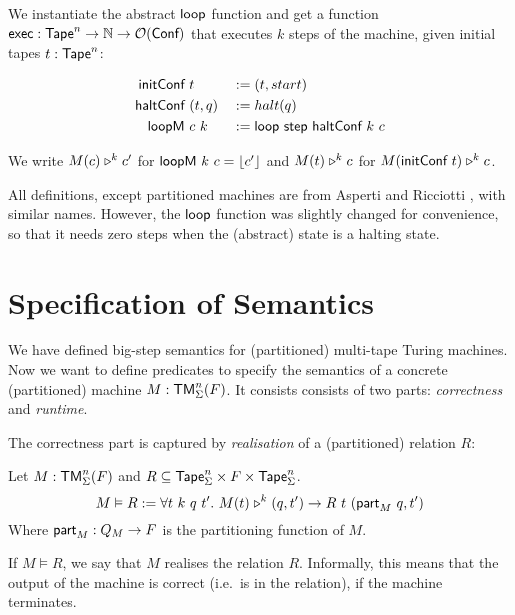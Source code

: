 We instantiate the abstract $\textsf{loop}$ function and get a function $\textsf{exec} : \textsf{Tape}^n \rightarrow \mathbb{N} \rightarrow \mathcal{O}(\textsf{Conf})$ that executes $k$ steps
of the machine, given initial tapes $t: \textsf{Tape}^n$:

\begin{definition}
  \begin{alignat*}{3}
    \textsf{initConf}   &~t         &&:= (t, start) \\
    \textsf{haltConf}   &~(t, q)    &&:= halt(q) \\
    \textsf{loopM}      &~c~k       &&:= \textsf{loop}~\textsf{step}~\textsf{haltConf}~k~c
  \end{alignat*}
\end{definition}

We write $M(c) \mathrel{\triangleright}^k c'$ for $\textsf{loopM}~k~c = \left\lfloor {c'} \right\rfloor$ and $M(t) \mathrel{\triangleright}^k c$ for $M(\textsf{initConf}~t) \mathrel{\triangleright}^k c$.

All definitions, except partitioned machines are from Asperti and Ricciotti \cite{asperti2015}, with similar names.  However, the $\textsf{loop}$ function
was slightly changed for convenience, so that it needs zero steps when the (abstract) state is a halting state.

\section{Specification of Semantics}
\label{sec:spec_semantics}

We have defined big-step semantics for (partitioned) multi-tape Turing machines.  Now we want to define predicates to specify the semantics of a
concrete (partitioned) machine $M: \textsf{TM}_\Sigma^n(F)$.  It consists consists of two parts: \emph{correctness} and \emph{runtime}.

The correctness part is captured by \emph{realisation} of a (partitioned) relation $R$:

\begin{definition}[Realisation]
  \label{def:realisation}
  Let $M:\textsf{TM}_\Sigma^n(F)$ and $R \subseteq \textsf{Tape}_\Sigma^n \times F \times \textsf{Tape}_\Sigma^n$.
  \[
    M \vDash R :=
    \forall t~k~q~t'.~M(t) \mathrel{\triangleright}^k (q, t') \rightarrow
    R~t~(\textsf{part}_M~q, t')
  \]
  Where $\textsf{part}_M : Q_M \rightarrow F$ is the partitioning function of $M$.
\end{definition}

If $M \vDash R$, we say that $M$ realises the relation $R$.  Informally, this means that the output of the machine is correct (i.e.\ is in the
relation), if the machine terminates.

